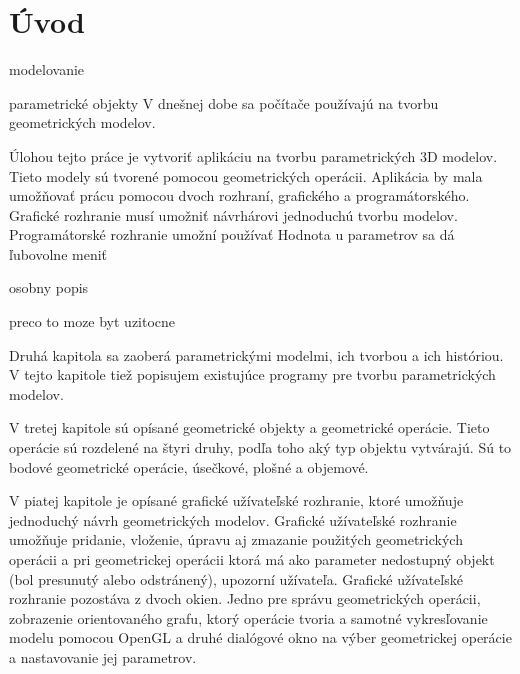 

\chapter{Úvod}
modelovanie 

parametrické objekty 
V dnešnej dobe sa počítače používajú na tvorbu geometrických modelov.

Úlohou tejto práce je vytvoriť aplikáciu na tvorbu parametrických 3D modelov. Tieto modely sú tvorené pomocou geometrických operácii. Aplikácia by mala umožňovať prácu pomocou dvoch rozhraní, grafického a programátorského. Grafické rozhranie musí umožniť návrhárovi jednoduchú tvorbu modelov. Programátorské rozhranie umožní používať  Hodnota u parametrov sa dá ľubovolne meniť  

osobny popis

preco to moze byt uzitocne 

Druhá kapitola sa zaoberá parametrickými modelmi, ich tvorbou a ich históriou. V tejto kapitole tiež popisujem existujúce programy pre tvorbu parametrických modelov.


V tretej kapitole sú opísané geometrické objekty a geometrické operácie. Tieto operácie sú rozdelené na štyri druhy, podľa toho aký typ objektu vytvárajú. Sú to bodové geometrické operácie, úsečkové, plošné a objemové. 


V piatej kapitole je opísané grafické užívateľské rozhranie, ktoré umožňuje jednoduchý návrh geometrických modelov. Grafické užívateľské rozhranie umožňuje pridanie, vloženie, úpravu aj zmazanie použitých geometrických operácii a pri geometrickej operácii ktorá má ako parameter nedostupný objekt (bol presunutý alebo odstránený), upozorní užívateľa. Grafické užívateľské rozhranie pozostáva z dvoch okien. Jedno pre správu geometrických operácii, zobrazenie orientovaného grafu, ktorý operácie tvoria a samotné vykresľovanie modelu pomocou OpenGL a druhé dialógové okno na výber geometrickej operácie a nastavovanie jej parametrov. 

